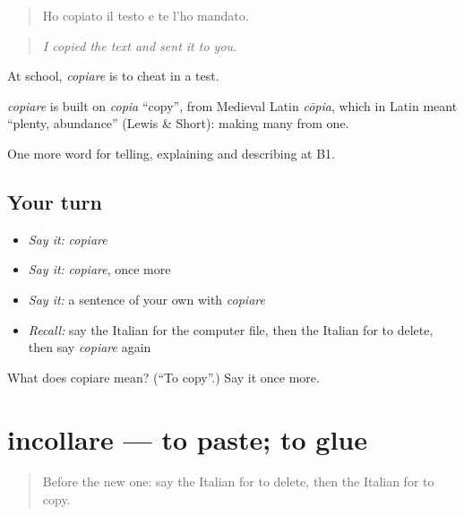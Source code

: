 \begin{quote}
Ho copiato il testo e te l'ho mandato.
\end{quote}

\begin{quote}
\emph{I copied the text and sent it to you.}
\end{quote}

At school, \emph{copiare} is to cheat in a test.

\begin{cousinweb}
\emph{copiare} is built on \emph{copia} \textquotedblleft{}copy\textquotedblright{}, from Medieval Latin \emph{cōpia}, which in Latin meant \textquotedblleft{}plenty, abundance\textquotedblright{} (Lewis \& Short): making many from one.
\end{cousinweb}

\begin{grammarlens}[title={What you've built}]
One more word for telling, explaining and describing at B1.
\end{grammarlens}

\subsection*{Your turn}
\begin{itemize}
\raggedright
  \item \emph{Say it:} \emph{copiare}
  \item \emph{Say it:} \emph{copiare}, once more
  \item \emph{Say it:} a sentence of your own with \emph{copiare}
  \item \emph{Recall:} say the Italian for the computer file, then the Italian for to delete, then say \emph{copiare} again
\end{itemize}

\begin{tcolorbox}[breakable,colback=teal!4,colframe=teal!35!black,title={Before you move on}]
What does copiare mean? (\textquotedblleft{}To copy\textquotedblright{}.) Say it once more.
\end{tcolorbox}
\section[incollare]{incollare — to paste; to glue}

\label{lesson:IT-C401-incollare}



\begin{quote}
Before the new one: say the Italian for to delete, then the Italian for to copy.
\end{quote}

